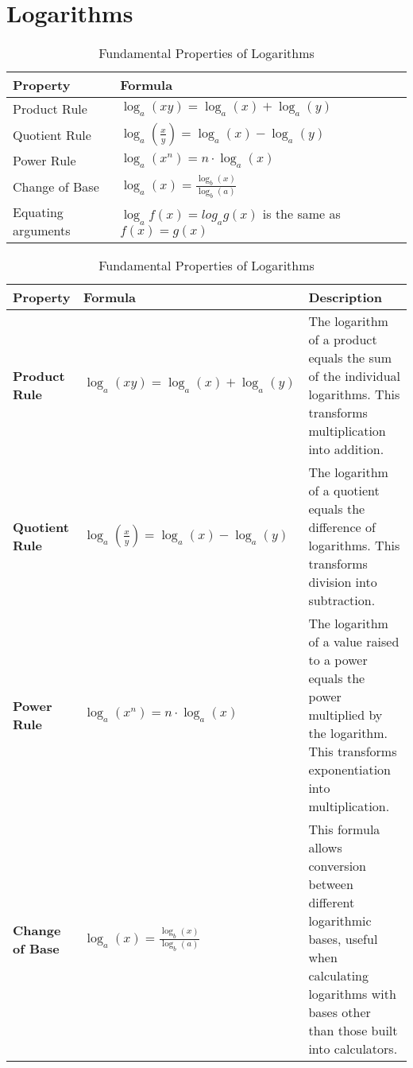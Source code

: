 \documentclass{article}
\begin{document}
\section{Logarithms}
\begin{table}[htbp]
  \centering
  \begin{tabular}{|l|l|}
    \hline
    \textbf{Property} & \textbf{Formula} \\
    \hline
    Product Rule & $\log_a(xy) = \log_a(x) + \log_a(y)$ \\
    \hline
    Quotient Rule & $\log_a\left(\frac{x}{y}\right) = \log_a(x) - \log_a(y)$ \\
    \hline
    Power Rule & $\log_a(x^n) = n \cdot \log_a(x)$ \\
    \hline
    Change of Base & $\log_a(x) = \frac{\log_b(x)}{\log_b(a)}$ \\
    \hline
    Equating arguments & $\log_af(x) = log_ag(x)$ is the same as $f(x) = g(x)$ \\
    \hline
  \end{tabular}
  \caption{Fundamental Properties of Logarithms}
  \label{tab:log_properties}
\end{table}

\begin{table}[htbp]
  \centering
  \renewcommand{\arraystretch}{1.5} %
  \setlength{\tabcolsep}{15pt} %
  \begin{tabular}{|l|p{5cm}|p{6cm}|}
    \hline
    \textbf{Property} & \textbf{Formula} & \textbf{Description} \\
    \hline
    \textbf{Product Rule} &
                            $\log_a(xy) = \log_a(x) + \log_a(y)$ &
                                                                   The logarithm of a product equals the sum of the individual logarithms. This transforms multiplication into addition. \\
    \hline
    \textbf{Quotient Rule} &
                             $\log_a\left(\frac{x}{y}\right) = \log_a(x) - \log_a(y)$ &
                                                                                        The logarithm of a quotient equals the difference of logarithms. This transforms division into subtraction. \\
    \hline
    \textbf{Power Rule} &
                          $\log_a(x^n) = n \cdot \log_a(x)$ &
                                                              The logarithm of a value raised to a power equals the power multiplied by the logarithm. This transforms exponentiation into multiplication. \\
    \hline
    \textbf{Change of Base} &
                              $\log_a(x) = \frac{\log_b(x)}{\log_b(a)}$ &
                                                                          This formula allows conversion between different logarithmic bases, useful when calculating logarithms with bases other than those built into calculators. \\
    \hline
  \end{tabular}
  \caption{Fundamental Properties of Logarithms}
  \label{tab:log_properties}
\end{table}
\end{document}
